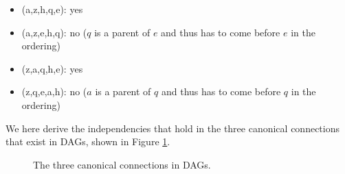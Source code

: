 \begin{exenumerate}
  \begin{solution}
    \begin{itemize}
    \item (a,z,h,q,e): yes
    \item (a,z,e,h,q): no ($q$ is a parent of $e$ and thus has to come before $e$ in the ordering)
    \item (z,a,q,h,e): yes
    \item (z,q,e,a,h): no ($a$ is a parent of $q$ and thus has to come before $q$ in the ordering)
    \end{itemize}
  \end{solution}

%
  
\end{exenumerate}


\label{ex:canonical-connections}
We here derive the independencies that hold in the three canonical
connections that exist in DAGs, shown in Figure \ref{fig:canonical-connections}.

\begin{figure}[h!]
  \begin{center}
    \hspace{2ex}
    \hspace{2ex}
  \end{center}
  \caption{\label{fig:canonical-connections}The three canonical connections in DAGs.}
\end{figure}


